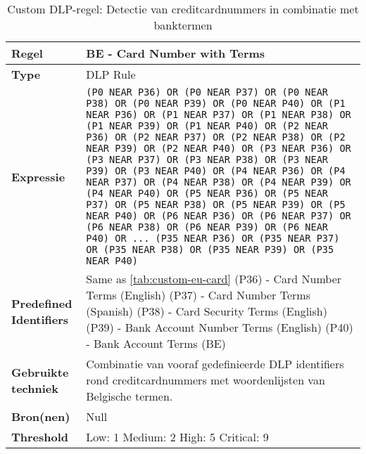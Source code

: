 \begin{table}[h]
    \centering
    \small
    \begin{tabular}{p{4cm} p{10cm}}
        \toprule
        \textbf{Regel} & BE - Card Number with Terms \\
        \midrule
        \textbf{Type} & DLP Rule \\
        \textbf{Expressie} & \texttt{(P0 NEAR P36) OR (P0 NEAR P37) OR (P0 NEAR P38) OR (P0 NEAR P39) OR (P0 NEAR P40) OR (P1 NEAR P36) OR (P1 NEAR P37) OR (P1 NEAR P38) OR (P1 NEAR P39) OR (P1 NEAR P40) OR (P2 NEAR P36) OR (P2 NEAR P37) OR (P2 NEAR P38) OR (P2 NEAR P39) OR (P2 NEAR P40) OR (P3 NEAR P36) OR (P3 NEAR P37) OR (P3 NEAR P38) OR (P3 NEAR P39) OR (P3 NEAR P40) OR (P4 NEAR P36) OR (P4 NEAR P37) OR (P4 NEAR P38) OR (P4 NEAR P39) OR (P4 NEAR P40) OR (P5 NEAR P36) OR (P5 NEAR P37) OR (P5 NEAR P38) OR (P5 NEAR P39) OR (P5 NEAR P40) OR (P6 NEAR P36) OR (P6 NEAR P37) OR (P6 NEAR P38) OR (P6 NEAR P39) OR (P6 NEAR P40) OR \newline
        ... \newline
        (P35 NEAR P36) OR (P35 NEAR P37) OR (P35 NEAR P38) OR (P35 NEAR P39) OR (P35 NEAR P40)} \\
        \textbf{Predefined Identifiers} & 
        Same as \ref{tab:custom-eu-card} \newline
        (P36) - Card Number Terms (English) \newline
        (P37) - Card Number Terms (Spanish) \newline
        (P38) - Card Security Terms (English) \newline
        (P39) - Bank Account Number Terms (English) \newline
        (P40) - Bank Account Terms (BE) \\
        \textbf{Gebruikte techniek} & Combinatie van vooraf gedefinieerde DLP identifiers rond creditcardnummers met woordenlijsten van Belgische termen. \\
        \textbf{Bron(nen)} & Null \\
        \textbf{Threshold} & Low: 1 \quad Medium: 2 \quad High: 5 \quad Critical: 9 \\
        \bottomrule
    \end{tabular}
    \caption{Custom DLP-regel: Detectie van creditcardnummers in combinatie met banktermen}
    \label{tab:custom-eu-card-terms}
\end{table}



